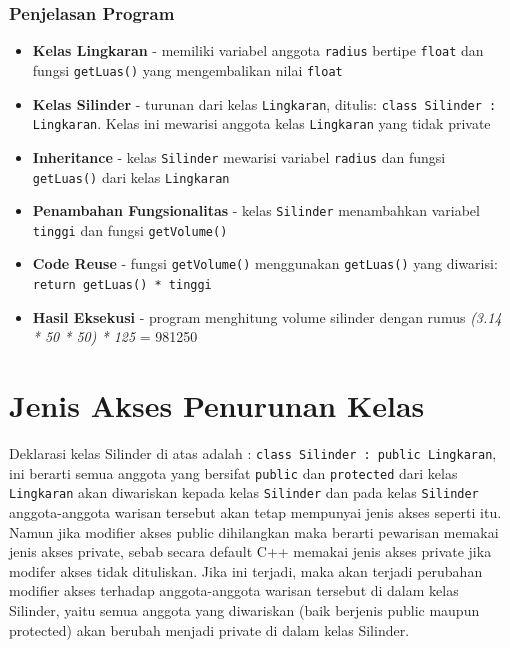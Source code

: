 \subsubsection*{Penjelasan Program}

\begin{itemize}
\item \textbf{Kelas Lingkaran} - memiliki variabel anggota \texttt{radius} bertipe \texttt{float} dan fungsi \texttt{getLuas()} yang mengembalikan nilai \texttt{float}

\item \textbf{Kelas Silinder} - turunan dari kelas \texttt{Lingkaran}, ditulis: \texttt{class Silinder : Lingkaran}. Kelas ini mewarisi anggota kelas \texttt{Lingkaran} yang tidak private

\item \textbf{Inheritance} - kelas \texttt{Silinder} mewarisi variabel \texttt{radius} dan fungsi \texttt{getLuas()} dari kelas \texttt{Lingkaran}

\item \textbf{Penambahan Fungsionalitas} - kelas \texttt{Silinder} menambahkan variabel \texttt{tinggi} dan fungsi \texttt{getVolume()}

\item \textbf{Code Reuse} - fungsi \texttt{getVolume()} menggunakan \texttt{getLuas()} yang diwarisi: \texttt{return getLuas() * tinggi}

\item \textbf{Hasil Eksekusi} - program menghitung volume silinder dengan rumus \emph{(3.14 * 50 * 50) * 125} = 981250
\end{itemize}

\section{Jenis Akses Penurunan Kelas}\label{jenis-akses-penurunan-kelas}

Deklarasi kelas Silinder di atas adalah :
\texttt{class\ Silinder\ :\ public\ Lingkaran}, ini berarti semua
anggota yang bersifat \texttt{public} dan \texttt{protected} dari kelas
\texttt{Lingkaran} akan diwariskan kepada kelas \texttt{Silinder} dan
pada kelas \texttt{Silinder} anggota-anggota warisan tersebut akan tetap
mempunyai jenis akses seperti itu. Namun jika modifier akses public
dihilangkan maka berarti pewarisan memakai jenis akses private, sebab
secara default C++ memakai jenis akses private jika modifer akses tidak
dituliskan. Jika ini terjadi, maka akan terjadi perubahan modifier akses
terhadap anggota-anggota warisan tersebut di dalam kelas Silinder, yaitu
semua anggota yang diwariskan (baik berjenis public maupun protected)
akan berubah menjadi private di dalam kelas Silinder.

